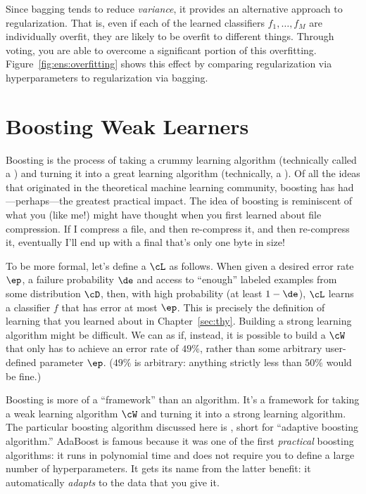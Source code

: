
Since bagging tends to reduce \emph{variance}, it provides an
alternative approach to regularization.  That is, even if each of the
learned classifiers $f_1, \dots, f_M$ are individually overfit, they
are likely to be overfit to different things.  Through voting, you are
able to overcome a significant portion of this overfitting.
Figure~\ref{fig:ens:overfitting} shows this effect by comparing
regularization via hyperparameters to regularization via bagging.

\section{Boosting Weak Learners}

Boosting is the process of taking a crummy learning algorithm
(technically called a ) and turning it into a
great learning algorithm (technically, a ).
Of all the ideas that originated in the theoretical machine learning
community, boosting has had---perhaps---the greatest practical impact.
The idea of boosting is reminiscent of what you (like me!)  might have
thought when you first learned about file compression.  If I compress
a file, and then re-compress it, and then re-compress it, eventually
I'll end up with a final that's only one byte in size!

To be more formal, let's define a 
$\cL$ as follows.  When given a desired error rate $\ep$, a failure
probability $\de$ and access to ``enough'' labeled examples from some
distribution $\cD$, then, with high probability (at least $1-\de$),
$\cL$ learns a classifier $f$ that has error at most $\ep$.  This is
precisely the definition of  learning that you learned
about in Chapter~\ref{sec:thy}.  Building a strong learning algorithm
might be difficult.  We can as if, instead, it is possible to build a
 $\cW$ that only has to achieve an
error rate of $49\%$, rather than some arbitrary user-defined
parameter $\ep$.  ($49\%$ is arbitrary: anything strictly less than
$50\%$ would be fine.)

Boosting is more of a ``framework'' than an algorithm.  It's a
framework for taking a weak learning algorithm $\cW$ and turning it
into a strong learning algorithm.  The particular boosting algorithm
discussed here is , short for ``adaptive boosting
algorithm.''  AdaBoost is famous because it was one of the first
\emph{practical} boosting algorithms: it runs in polynomial time and
does not require you to define a large number of hyperparameters.  It
gets its name from the latter benefit: it automatically \emph{adapts}
to the data that you give it.

